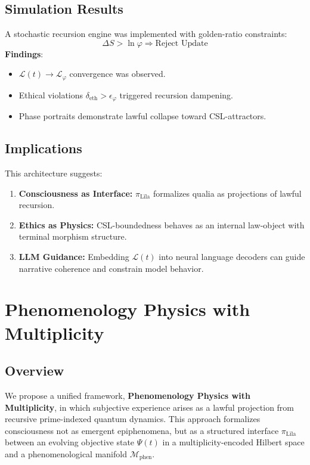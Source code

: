 \documentclass[12]{amsart}
\theoremstyle{plain}
\begin{document}
\subsection{Simulation Results}
A stochastic recursion engine was implemented with golden-ratio constraints:
\[
\Delta S > \ln \varphi \Rightarrow \text{Reject Update}
\]
\textbf{Findings}:
\begin{itemize}
    \item $\mathcal{L}(t) \to \mathcal{L}_\varphi$ convergence was observed.
    \item Ethical violations $\delta_{\text{eth}} > \epsilon_\varphi$ triggered recursion dampening.
    \item Phase portraits demonstrate lawful collapse toward CSL-attractors.
\end{itemize}

\subsection{Implications}
This architecture suggests:
\begin{enumerate}
    \item \textbf{Consciousness as Interface:} $\pi_{\text{Līla}}$ formalizes qualia as projections of lawful recursion.
    \item \textbf{Ethics as Physics:} CSL-boundedness behaves as an internal law-object with terminal morphism structure.
    \item \textbf{LLM Guidance:} Embedding $\mathcal{L}(t)$ into neural language decoders can guide narrative coherence and constrain model behavior.
\end{enumerate}

\section{Phenomenology Physics with Multiplicity}
\label{sec:phenomenology_physics}

\subsection{Overview}
We propose a unified framework, \textbf{Phenomenology Physics with Multiplicity}, in which subjective experience arises as a lawful projection from recursive prime-indexed quantum dynamics. This approach formalizes consciousness not as emergent epiphenomena, but as a structured interface $\pi_{\text{Līla}}$ between an evolving objective state $\Psi(t)$ in a multiplicity-encoded Hilbert space and a phenomenological manifold $\mathcal{M}_{\text{phen}}$. 
\end{document}
